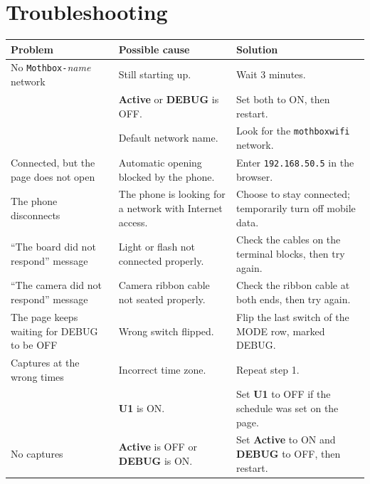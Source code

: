 \documentclass[10pt,a4paper]{article}
\newcommand{\sw}[1]{\textbf{#1}}
\begin{document}
\section{Troubleshooting}
\small
\begin{tabularx}{\linewidth}{@{}>{\raggedright\arraybackslash}p{5.2cm}>{\raggedright\arraybackslash}p{6.6cm}L@{}}
\toprule
\normalsize\bfseries Problem & \normalsize\bfseries Possible cause & \normalsize\bfseries Solution \\
\midrule
No \texttt{Mothbox-}\textit{name} network & Still starting up. & Wait 3 minutes. \\
 & \sw{Active} or \sw{DEBUG} is OFF. & Set both to ON, then restart. \\
 & Default network name. & Look for the \texttt{mothboxwifi} network. \\
\midrule
Connected, but the page does not open & Automatic opening blocked by the phone. & Enter \texttt{192.168.50.5} in the browser. \\
\midrule
The phone disconnects & The phone is looking for a network with Internet access. & Choose to stay connected; temporarily turn off mobile data. \\
\midrule
``The board did not respond'' message & Light or flash not connected properly. & Check the cables on the terminal blocks, then try again. \\
\midrule
``The camera did not respond'' message & Camera ribbon cable not seated properly. & Check the ribbon cable at both ends, then try again. \\
\midrule
The page keeps waiting for DEBUG to be OFF & Wrong switch flipped. & Flip the last switch of the MODE row, marked DEBUG. \\
\midrule
Captures at the wrong times & Incorrect time zone. & Repeat step 1. \\
 & \sw{U1} is ON. & Set \sw{U1} to OFF if the schedule was set on the page. \\
\midrule
No captures & \sw{Active} is OFF or \sw{DEBUG} is ON. & Set \sw{Active} to ON and \sw{DEBUG} to OFF, then restart. \\
\bottomrule
\end{tabularx}
\end{document}
